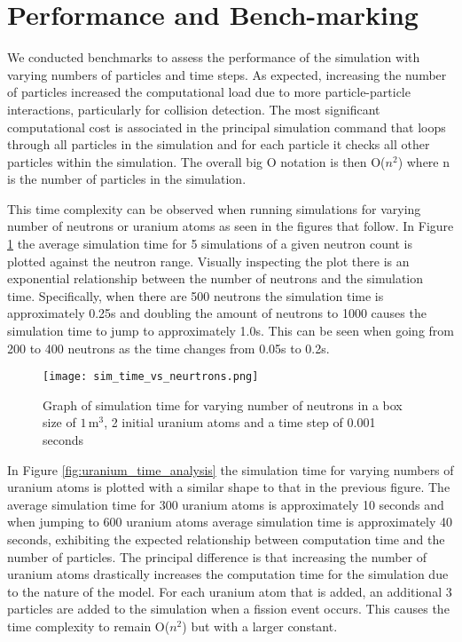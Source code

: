 \documentclass[twocolumn, 11pt]{article}
\begin{document}
\section*{Performance and Bench-marking}
We conducted benchmarks to assess the performance of the simulation with varying numbers of particles and time steps. As expected, increasing the number of particles increased the computational load due to more particle-particle interactions, particularly for collision detection. The most significant computational cost is associated in the principal simulation command that loops through all particles in the simulation and for each particle it checks all other particles within the simulation. The overall big O notation is then O(\mathrm$n^2$) where n is the number of particles in the simulation. 

 This time complexity can be observed when running simulations for varying number of neutrons or uranium atoms as seen in the figures that follow. In Figure \ref{fig:neutron_time_analysis} the average simulation time for 5 simulations of a given neutron count is plotted against the neutron range. Visually inspecting the plot there is an exponential relationship between the number of neutrons and the simulation time. Specifically, when there are 500 neutrons the simulation time is approximately 0.25s and doubling the amount of neutrons to 1000 causes the simulation time to jump to approximately 1.0s. This can be seen when going from 200 to 400 neutrons as the time changes from 0.05s to 0.2s.           

\begin{figure}[h]
    \centering
    \texttt{[image: sim\_time\_vs\_neurtrons.png]}
    \caption{Graph of simulation time for varying number of neutrons in a box size of \(1 \,\text{m}^3\), 2 initial uranium atoms and a time step of 0.001 seconds}
    \label{fig:neutron_time_analysis}
\end{figure}

In Figure \ref{fig:uranium_time_analysis} the simulation time for varying numbers of uranium atoms is plotted with a similar shape to that in the previous figure. The average simulation time for 300 uranium atoms is approximately 10 seconds and when jumping to 600 uranium atoms average simulation time is approximately 40 seconds, exhibiting the expected relationship between computation time and the number of particles. The principal difference is that increasing the number of uranium atoms drastically increases the computation time for the simulation due to the nature of the model. For each uranium atom that is added, an additional 3 particles are added to the simulation when a fission event occurs. This causes the time complexity to remain O(\mathrm$n^2$) but with a larger constant. 
\end{document}
